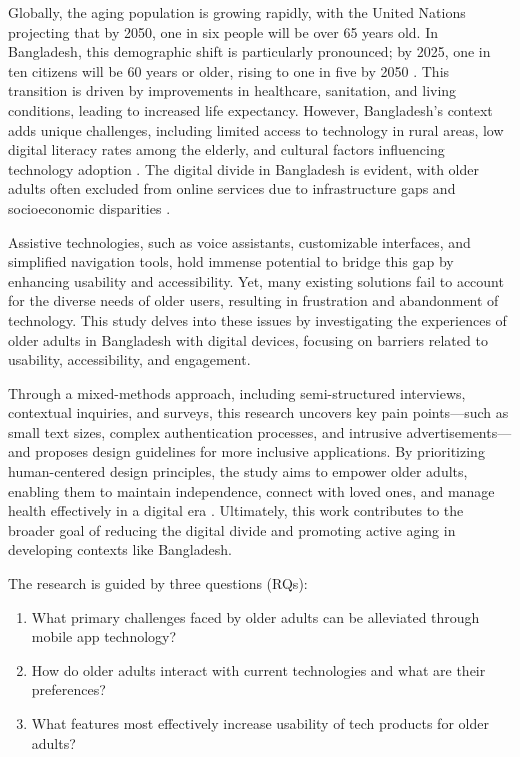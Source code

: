 \documentclass[acmlarge]{acmart}
\begin{document}
Globally, the aging population is growing rapidly, with the United Nations projecting that by 2050, one in six people will be over 65 years old. In Bangladesh, this demographic shift is particularly pronounced; by 2025, one in ten citizens will be 60 years or older, rising to one in five by 2050 \cite{kabir2025agingbangladesh}. This transition is driven by improvements in healthcare, sanitation, and living conditions, leading to increased life expectancy. However, Bangladesh's context adds unique challenges, including limited access to technology in rural areas, low digital literacy rates among the elderly, and cultural factors influencing technology adoption \cite{islam2019elderlybangladesh, rahman2022localcontext}. The digital divide in Bangladesh is evident, with older adults often excluded from online services due to infrastructure gaps and socioeconomic disparities \cite{rahman2021digitalinequality}.

Assistive technologies, such as voice assistants, customizable interfaces, and simplified navigation tools, hold immense potential to bridge this gap by enhancing usability and accessibility. Yet, many existing solutions fail to account for the diverse needs of older users, resulting in frustration and abandonment of technology. This study delves into these issues by investigating the experiences of older adults in Bangladesh with digital devices, focusing on barriers related to usability, accessibility, and engagement.

Through a mixed-methods approach, including semi-structured interviews, contextual inquiries, and surveys, this research uncovers key pain points—such as small text sizes, complex authentication processes, and intrusive advertisements—and proposes design guidelines for more inclusive applications. By prioritizing human-centered design principles, the study aims to empower older adults, enabling them to maintain independence, connect with loved ones, and manage health effectively in a digital era \cite{czaja2019aging, fisk2009designing}. Ultimately, this work contributes to the broader goal of reducing the digital divide and promoting active aging in developing contexts like Bangladesh.

The research is guided by three questions (RQs):
\begin{enumerate}
    \item What primary challenges faced by older adults can be alleviated through mobile app technology?
    \item How do older adults interact with current technologies and what are their preferences?
    \item What features most effectively increase usability of tech products for older adults?
\end{enumerate}
\end{document}
